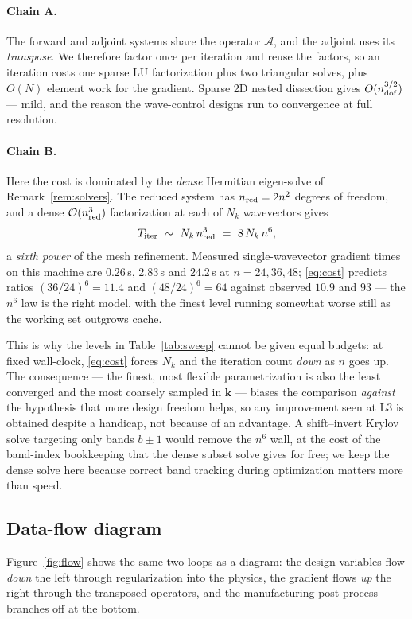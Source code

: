 \documentclass[11pt]{article}
\begin{document}
\paragraph{Chain A.} The forward and adjoint systems share the operator
$\mathcal A$, and the adjoint uses its \emph{transpose}. We therefore factor once
per iteration and reuse the factors, so an iteration costs one sparse LU
factorization plus two triangular solves, plus $O(N)$ element work for the
gradient. Sparse 2D nested dissection gives $O(n_{\rm dof}^{3/2})$ --- mild, and
the reason the wave-control designs run to convergence at full resolution.

\paragraph{Chain B.} Here the cost is dominated by the \emph{dense} Hermitian
eigen-solve of Remark~\ref{rem:solvers}. The reduced system has
$n_{\rm red}=2n^2$ degrees of freedom, and a dense $\mathcal O(n_{\rm red}^3)$
factorization at each of $N_k$ wavevectors gives
\begin{equation}
  T_{\rm iter}\ \sim\ N_k\,n_{\rm red}^3\ =\ 8\,N_k\,n^{6},
  \label{eq:cost}
\end{equation}
a \emph{sixth power} of the mesh refinement. Measured single-wavevector gradient
times on this machine are $0.26$\,s, $2.83$\,s and $24.2$\,s at $n=24,36,48$;
\eqref{eq:cost} predicts ratios $(36/24)^6=11.4$ and $(48/24)^6=64$ against
observed $10.9$ and $93$ --- the $n^6$ law is the right model, with the finest
level running somewhat worse still as the working set outgrows cache.

This is why the levels in Table~\ref{tab:sweep} cannot be given equal budgets: at
fixed wall-clock, \eqref{eq:cost} forces $N_k$ and the iteration count \emph{down}
as $n$ goes up. The consequence --- the finest, most flexible parametrization is
also the least converged and the most coarsely sampled in $\mathbf k$ --- biases
the comparison \emph{against} the hypothesis that more design freedom helps, so any
improvement seen at L3 is obtained despite a handicap, not because of an
advantage. A shift--invert Krylov solve targeting only bands $b\pm1$ would remove
the $n^6$ wall, at the cost of the band-index bookkeeping that the dense subset
solve gives for free; we keep the dense solve here because correct band tracking
during optimization matters more than speed.

\subsection{Data-flow diagram}
\label{sec:algo:flow}
Figure~\ref{fig:flow} shows the same two loops as a diagram: the design variables
flow \emph{down} the left through regularization into the physics, the gradient
flows \emph{up} the right through the transposed operators, and the manufacturing
post-process branches off at the bottom.
\end{document}
